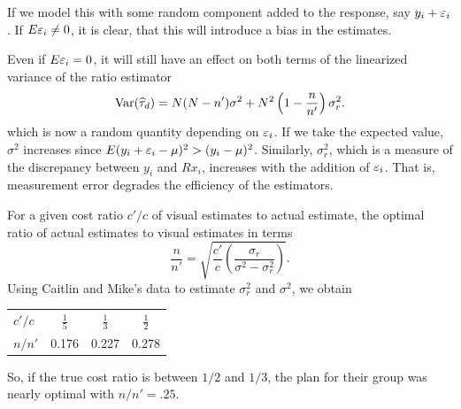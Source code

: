 \documentclass[usenames,dvipsnames]{homework}
\begin{document}
\begin{longproblem}
\begin{solution}
  If we model this with some random component added to the response, say $y_i + \varepsilon_i$. If $E\varepsilon_i \not=0$, it is clear, that this will introduce a bias in the estimates.
  
Even if $E\varepsilon_i = 0$, it will still have an effect on both terms of the linearized variance of the ratio estimator  
$$
\mathrm{Var}(\widehat\tau_d)  = N(N-n')\sigma^2 + N^2\left(1-\frac n{n'}\right)\sigma_r^2. 
$$
which is now a random quantity depending on $\varepsilon_i$. If we take the expected value, $\sigma^2$ increases since $E(y_i+\varepsilon_i - \mu)^2 > (y_i - \mu)^2$. Similarly, $\sigma_r^2$, which is a measure of the discrepancy between $y_i$ and $R x_i$, increases with the addition of $\varepsilon_i$.  That is, measurement error degrades the efficiency of the estimators.

\end{solution}


\begin{solution}
  For a given cost ratio $c'/c$ of visual estimates to actual estimate, the optimal ratio of actual estimates to visual estimates in terms  
  $$
  \frac{n}{n'} = \sqrt{\frac{c'}{c} \left(\frac{\sigma_r}{\sigma^2 - \sigma_r^2}\right)}.
  $$
  Using Caitlin and Mike's data to estimate $\sigma_r^2$ and $\sigma^2$, we obtain
\begin{center}
\renewcommand{\arraystretch}{1.6}
\begin{tabular}{l|c c c }
$c'/c$ &$\frac 15$&$\frac 13$&$\frac 12$\\
$n/n'$ & 0.176    & 0.227    &0.278     \\
\end{tabular}
\end{center}
So, if the true cost ratio is between $1/2$ and $1/3$, the plan for their group was nearly optimal with $n/n' = .25$.
\end{solution}
\end{longproblem}
\newpage
\end{document}
